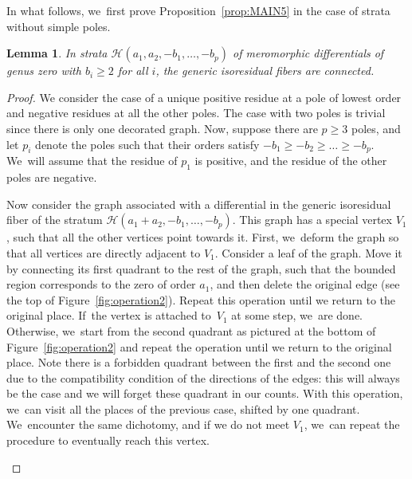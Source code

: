 \documentclass[11pt]{article}
\newcommand\calH{{\mathcal H}}
\newtheorem{lem}[thm]{Lemma}
\theoremstyle{definition}
\begin{document}
In what follows, we~first prove Proposition~\ref{prop:MAIN5} in the case of strata without simple poles.
\begin{lem}\label{lem:MAIN5nosimple}
In strata $\calH(a_{1},a_{2},-b_{1},\dots,-b_{p})$ of meromorphic differentials of genus zero with $b_{i}\geq2$ for all $i$, the generic isoresidual fibers are connected.
\end{lem}
\begin{proof}
We consider the case of a unique positive residue at a pole of lowest order and negative residues at all the other poles. The case with two poles is trivial since there is only one decorated graph. Now, suppose there are $p\geq3$ poles, and let $p_i$ denote the poles such that their orders satisfy $-b_{1}\geq -b_{2}\geq \dots \geq -b_{p}$. We~will assume that the residue of $p_{1}$ is positive, and the residue of the other poles are negative.

Now consider the graph associated with a differential in the generic isoresidual fiber of the stratum $\calH(a_{1}+a_{2},-b_{1},\dots,-b_{p})$. This graph has a special vertex $V_{1}$, such that all the other vertices point towards it. First, we~deform the graph so that all vertices are directly adjacent to $V_{1}$. Consider a leaf of the graph. Move it by connecting its first quadrant to the rest of the graph, such that the bounded region corresponds to the zero of order $a_{1}$, and then delete the original edge (see the top of Figure~\ref{fig:operation2}). Repeat this operation until we return to the original place. If~the vertex is attached to~$V_{1}$ at some step, we~are done. Otherwise, we~start from the second quadrant as pictured at the bottom of Figure~\ref{fig:operation2} and repeat the operation until we return to the original place. Note there is a forbidden quadrant between the first and the second one due to the compatibility condition of the directions of the edges: this will always be the case and we will forget these quadrant in our counts. With this operation, we~can visit all the places of the previous case, shifted by one quadrant. We~encounter the same dichotomy, and if we do not meet $V_{1}$, we~can repeat the procedure to eventually reach this vertex.
\begin{figure}[ht]
\end{figure}
\end{proof}
\end{document}
